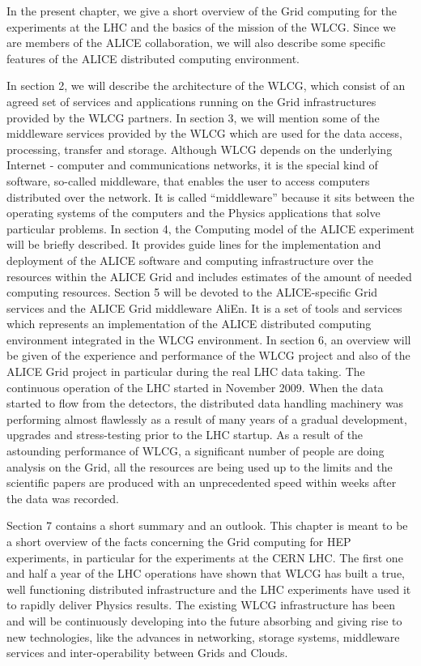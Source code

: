 In the present chapter, we give a short overview of the Grid
computing for the experiments at the LHC and the basics of the
mission of the WLCG.  Since we are members of the ALICE
collaboration, we will also describe some specific features of the
ALICE distributed computing environment.

In section 2, we will describe the architecture of the WLCG, which
consist of an agreed set of services and applications running on the
Grid infrastructures provided by the WLCG partners. In section 3, we
will mention some of the middleware services provided by the WLCG
which are used for the data access, processing, transfer and
storage. Although WLCG depends on the underlying Internet - computer
and communications networks, it is the special kind of software, so-called
middleware, that enables the user to access computers
distributed over the network. It is called ``middleware'' because it
sits between the operating systems of the computers and the Physics
applications that solve particular problems. In section 4, the
Computing model of the ALICE experiment will be briefly described.
It provides guide lines for the implementation and deployment of the
ALICE software and computing infrastructure over the resources
within the ALICE Grid and includes estimates of the amount
of needed computing resources. Section 5
will be devoted to the ALICE-specific Grid services and the ALICE
Grid middleware AliEn. It is a set of tools and services which
represents an implementation of the ALICE distributed computing
environment integrated in the WLCG environment.  In section 6, an
overview will be given of the experience and performance of the WLCG
project and also of the ALICE Grid project in particular during the
real LHC data taking. The continuous operation of the LHC started in
November 2009.  When the data started to flow from the detectors,
the distributed data handling machinery was performing almost
flawlessly as a result of many years of a gradual development,
upgrades and stress-testing prior to the LHC startup. As a result of
the astounding performance of WLCG, a significant number of people
are doing analysis on the Grid, all the resources are being used up
to the limits and the scientific papers are produced with an
unprecedented speed within weeks after the data was recorded.

Section 7 contains a short summary and an outlook. This chapter is
meant to be a short overview of the facts concerning the Grid
computing for HEP experiments, in particular for the experiments at
the CERN LHC. The first one and half a year of the LHC operations
have shown that WLCG has built a true, well functioning distributed
infrastructure and the LHC experiments have used it to rapidly
deliver Physics results. The existing WLCG infrastructure has been
and will be continuously developing into the future absorbing and
giving rise to new technologies, like the advances in networking,
storage systems, middleware services and inter-operability between
Grids and Clouds.




